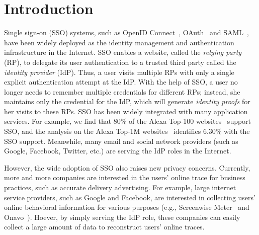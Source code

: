 \section{Introduction}
\label{sec:intro}

Single sign-on (SSO) systems, such as OpenID Connect~\cite{OpenIDConnect}, OAuth~\cite{rfc6749} and SAML~\cite{SAML}, have been widely deployed as the identity management and authentication infrastructure in the Internet.
SSO enables a website, called the \emph{relying party} (RP), to delegate its user authentication to a trusted third party called the \emph{identity provider} (IdP).
Thus, a user visits multiple RPs with only a single explicit authentication attempt at the IdP.
With the help of SSO, a user no longer needs to remember multiple credentials for different RPs; instead, she maintains only the credential for the IdP, which will generate \emph{identity proofs} for her visits to these RPs.
SSO has been widely integrated with many application services.
For example, we find that 80\% of the Alexa Top-100 websites~\cite{Alexa} support SSO, and the analysis on the Alexa Top-1M websites~\cite{GhasemisharifRC18} identifies 6.30\% with the SSO support.
Meanwhile, many email and social network providers (such as Google, Facebook, Twitter, etc.) are serving the IdP roles in the Internet. 

However, the wide adoption of SSO also raises new privacy concerns. Currently, more and more companies are interested in the users' online trace for business practices, such as accurate delivery advertising. For example, large internet service providers, such as Google and Facebook, are interested in collecting users' online behavioral information for various purposes (e.g., Screenwise Meter~\cite{googlenews} and Onavo~\cite{Onavo}). Hoever, by simply serving the IdP role, these companies can easily collect a large amount of data to reconstruct users' online traces. 


